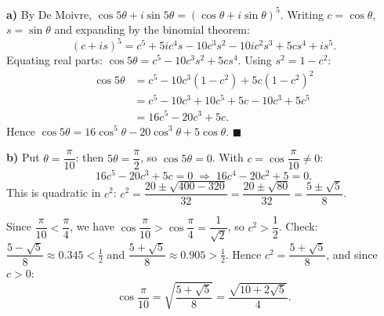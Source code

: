 \documentclass[11pt]{article}
\begin{document}
\begin{corrige}
\textbf{a)} By De Moivre, $\cos 5\theta + i\sin 5\theta = (\cos\theta + i\sin\theta)^5$. Writing $c = \cos\theta$, $s = \sin\theta$ and expanding by the binomial theorem:
\[ (c+is)^5 = c^5 + 5ic^4s - 10c^3s^2 - 10ic^2s^3 + 5cs^4 + is^5. \]
Equating real parts: $\cos 5\theta = c^5 - 10c^3s^2 + 5cs^4$. Using $s^2 = 1 - c^2$:
\begin{align*}
\cos 5\theta &= c^5 - 10c^3(1-c^2) + 5c(1-c^2)^2 \\
&= c^5 - 10c^3 + 10c^5 + 5c - 10c^3 + 5c^5 \\
&= 16c^5 - 20c^3 + 5c.
\end{align*}
Hence $\cos 5\theta = 16\cos^5\theta - 20\cos^3\theta + 5\cos\theta$. $\blacksquare$

\textbf{b)} Put $\theta = \dfrac{\pi}{10}$: then $5\theta = \dfrac{\pi}{2}$, so $\cos 5\theta = 0$. With $c = \cos\dfrac{\pi}{10} \neq 0$:
\[ 16c^5 - 20c^3 + 5c = 0 \;\Longrightarrow\; 16c^4 - 20c^2 + 5 = 0. \]
This is quadratic in $c^2$: $c^2 = \dfrac{20 \pm \sqrt{400 - 320}}{32} = \dfrac{20 \pm \sqrt{80}}{32} = \dfrac{5 \pm \sqrt5}{8}$.

Since $\dfrac{\pi}{10} < \dfrac{\pi}{4}$, we have $\cos\dfrac{\pi}{10} > \cos\dfrac{\pi}{4} = \dfrac{1}{\sqrt2}$, so $c^2 > \dfrac12$. Check: $\dfrac{5-\sqrt5}{8} \approx 0.345 < \tfrac12$ and $\dfrac{5+\sqrt5}{8} \approx 0.905 > \tfrac12$. Hence $c^2 = \dfrac{5+\sqrt5}{8}$, and since $c > 0$:
\[ \cos\frac{\pi}{10} = \sqrt{\frac{5+\sqrt5}{8}} = \frac{\sqrt{10 + 2\sqrt5}}{4}. \]
\end{corrige}
\end{document}
